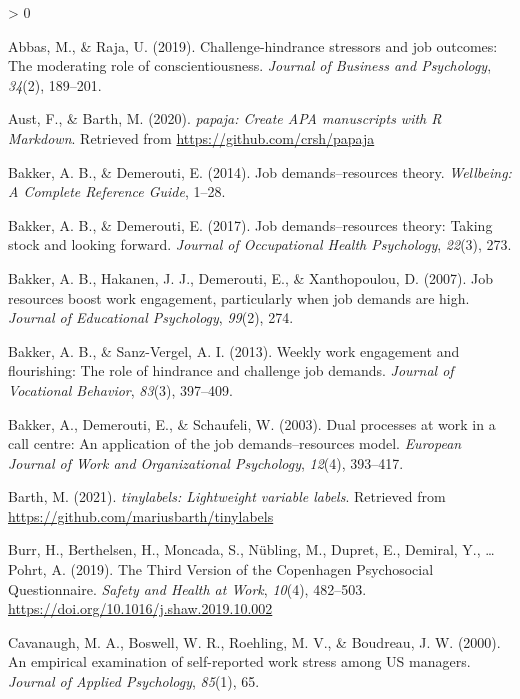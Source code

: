 \documentclass[
  english,
  man]{apa6}
\newlength{\cslhangindent}
\newenvironment{CSLReferences}[2] %
 {%
  \setlength{\parindent}{0pt}
  \ifodd #1 \everypar{\setlength{\hangindent}{\cslhangindent}}\ignorespaces\fi
  \ifnum #2 > 0
  \setlength{\parskip}{#2\baselineskip}
  \fi
 }%
 {}
\begin{document}
\hypertarget{refs}{}
\begin{CSLReferences}{1}{0}
\leavevmode\hypertarget{ref-abbas2019challenge}{}%
Abbas, M., \& Raja, U. (2019). Challenge-hindrance stressors and job outcomes: The moderating role of conscientiousness. \emph{Journal of Business and Psychology}, \emph{34}(2), 189--201.

\leavevmode\hypertarget{ref-R-papaja}{}%
Aust, F., \& Barth, M. (2020). \emph{{papaja}: {Create} {APA} manuscripts with {R Markdown}}. Retrieved from \url{https://github.com/crsh/papaja}

\leavevmode\hypertarget{ref-bakker2014job}{}%
Bakker, A. B., \& Demerouti, E. (2014). Job demands--resources theory. \emph{Wellbeing: A Complete Reference Guide}, 1--28.

\leavevmode\hypertarget{ref-bakker2017job}{}%
Bakker, A. B., \& Demerouti, E. (2017). Job demands--resources theory: Taking stock and looking forward. \emph{Journal of Occupational Health Psychology}, \emph{22}(3), 273.

\leavevmode\hypertarget{ref-bakker2007job}{}%
Bakker, A. B., Hakanen, J. J., Demerouti, E., \& Xanthopoulou, D. (2007). Job resources boost work engagement, particularly when job demands are high. \emph{Journal of Educational Psychology}, \emph{99}(2), 274.

\leavevmode\hypertarget{ref-bakker2013weekly}{}%
Bakker, A. B., \& Sanz-Vergel, A. I. (2013). Weekly work engagement and flourishing: The role of hindrance and challenge job demands. \emph{Journal of Vocational Behavior}, \emph{83}(3), 397--409.

\leavevmode\hypertarget{ref-bakker2003dual}{}%
Bakker, A., Demerouti, E., \& Schaufeli, W. (2003). Dual processes at work in a call centre: An application of the job demands--resources model. \emph{European Journal of Work and Organizational Psychology}, \emph{12}(4), 393--417.

\leavevmode\hypertarget{ref-R-tinylabels}{}%
Barth, M. (2021). \emph{{tinylabels}: Lightweight variable labels}. Retrieved from \url{https://github.com/mariusbarth/tinylabels}

\leavevmode\hypertarget{ref-burr_third_2019}{}%
Burr, H., Berthelsen, H., Moncada, S., Nübling, M., Dupret, E., Demiral, Y., \ldots{} Pohrt, A. (2019). The {Third} {Version} of the {Copenhagen} {Psychosocial} {Questionnaire}. \emph{Safety and Health at Work}, \emph{10}(4), 482--503. \url{https://doi.org/10.1016/j.shaw.2019.10.002}

\leavevmode\hypertarget{ref-cavanaugh2000empirical}{}%
Cavanaugh, M. A., Boswell, W. R., Roehling, M. V., \& Boudreau, J. W. (2000). An empirical examination of self-reported work stress among US managers. \emph{Journal of Applied Psychology}, \emph{85}(1), 65.


\end{CSLReferences}
\end{document}
